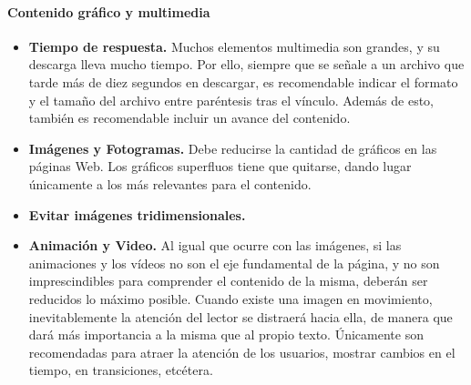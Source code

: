\documentclass[a4paper,oneside,11pt]{book}
\begin{document}
		\paragraph{Contenido gráfico y multimedia} %
		\label{par:cont_contenido_grafico_y_multimedia}
			\begin{itemize}
				\item \textbf{Tiempo de respuesta.} Muchos elementos multimedia son grandes, y su descarga lleva mucho tiempo. Por ello, siempre que se señale a un archivo que tarde más de diez segundos en descargar, es recomendable indicar el formato y el tamaño del archivo entre paréntesis tras el vínculo. Además de esto, también es recomendable incluir un avance del contenido.
				\item \textbf{Imágenes y Fotogramas.} 	Debe reducirse la cantidad de gráficos en las páginas Web. Los gráficos superfluos tiene que quitarse, dando lugar únicamente a los más relevantes para el contenido. 
				\item \textbf{Evitar imágenes tridimensionales.}
				\item \textbf{Animación y Video.} Al igual que ocurre con las imágenes, si las animaciones y los vídeos no son el eje fundamental de la página, y no son imprescindibles para comprender el contenido de la misma, deberán ser reducidos lo máximo posible. Cuando existe una imagen en movimiento, inevitablemente la atención del lector se distraerá hacia ella, de manera que dará más importancia a la misma que al propio texto. Únicamente son recomendadas para atraer la atención de los usuarios, mostrar cambios en el tiempo, en transiciones, etcétera.
			\end{itemize}

				
	
	
	
	
\end{document}
